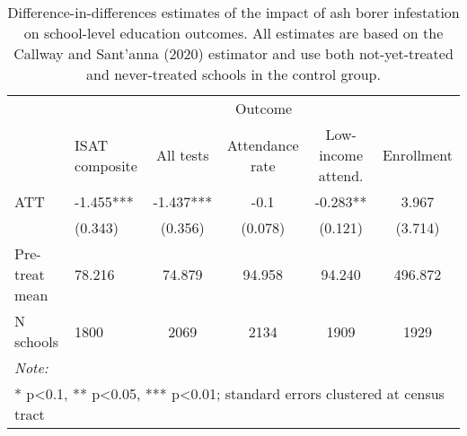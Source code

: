 \begin{table}[!h]

\caption{\label{tab:school-educ-table}Difference-in-differences estimates of the impact of ash borer infestation on school-level education outcomes. All estimates are based on the Callway and Sant'anna (2020) estimator and use both not-yet-treated and never-treated schools in the control group.}
\centering
\begin{tabular}[t]{llcccc}
\toprule
\multicolumn{1}{c}{ } & \multicolumn{5}{c}{Outcome} \\
\cmidrule(l{3pt}r{3pt}){2-6}
  & ISAT composite & All tests & Attendance rate & Low-income attend. & Enrollment\\
\midrule
ATT & -1.455*** & -1.437*** & -0.1 & -0.283** & 3.967\\
 & (0.343) & (0.356) & (0.078) & (0.121) & (3.714)\\
\midrule
Pre-treat mean & 78.216 & 74.879 & 94.958 & 94.240 & 496.872\\
N schools & 1800 & 2069 & 2134 & 1909 & 1929\\
\bottomrule
\multicolumn{6}{l}{\rule{0pt}{1em}\textit{Note: }}\\
\multicolumn{6}{l}{\rule{0pt}{1em}* p<0.1, ** p<0.05, *** p<0.01; standard errors clustered at census tract}\\
\end{tabular}
\end{table}
